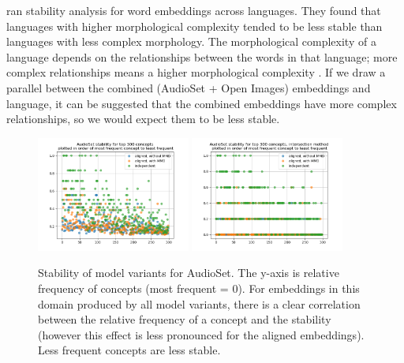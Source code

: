\cite{WordEmbeddingStability} ran stability analysis for word embeddings across languages. They found that languages with higher morphological complexity tended to be less stable than languages with less complex morphology. The morphological complexity of a language depends on the relationships between the words in that language; more complex relationships means a higher morphological complexity \cite{MorphologicalComplexity}. If we draw a parallel between the combined (AudioSet + Open Images) embeddings and language, it can be suggested that the combined embeddings have more complex relationships, so we would expect them to be less stable. 


\begin{figure}[H]
    \centering
    \includegraphics[width=0.45\textwidth]{images/results/audioset_stability.png}
    \includegraphics[width=0.45\textwidth]{images/results/audioset_stability_ixn.png}
    \caption{
        Stability of model variants for AudioSet. The y-axis is relative frequency of concepts (most frequent = 0). For embeddings in this domain produced by all model variants, there is a clear correlation between the relative frequency of a concept and the stability (however this effect is less pronounced for the aligned embeddings). Less frequent concepts are less stable. 
    }
\end{figure}

